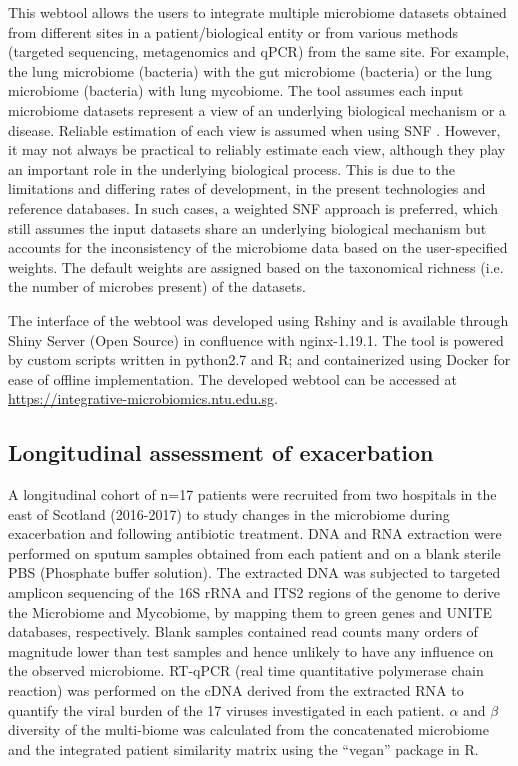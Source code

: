 This webtool allows the users to integrate multiple microbiome datasets obtained from different sites in a patient/biological entity or from various methods (targeted sequencing, metagenomics and qPCR) from the same site. For example, the lung microbiome (bacteria) with the gut microbiome (bacteria) or the lung microbiome (bacteria) with lung mycobiome. The tool assumes each input microbiome datasets represent a view of an underlying biological mechanism or a disease. Reliable estimation of each view is assumed when using SNF \cite{Jiang2019}. However, it may not always be practical to reliably estimate each view, although they play an important role in the underlying biological process. This is due to the limitations and differing rates of development, in the present technologies and reference databases. In such cases, a weighted SNF approach is preferred, which still assumes the input datasets share an underlying biological mechanism but accounts for the inconsistency of the microbiome data based on the user-specified weights. The default weights are assigned based on the taxonomical richness (i.e. the number of microbes present) of the datasets. 

The interface of the webtool was developed using Rshiny and is available through Shiny Server (Open Source) in confluence with nginx-1.19.1. The tool is powered by custom scripts written in python2.7 and R; and containerized using Docker for ease of offline implementation. The developed webtool can be accessed at \url{https://integrative-microbiomics.ntu.edu.sg}.

\subsection{Longitudinal assessment of exacerbation}

A longitudinal cohort of n=17 patients were recruited from two hospitals in the east of Scotland (2016-2017) to study changes in the microbiome during exacerbation and following antibiotic treatment. DNA and RNA extraction were performed on sputum samples obtained from each patient and on a blank sterile PBS (Phosphate buffer solution). The extracted DNA was subjected to targeted amplicon sequencing of the 16S rRNA and ITS2 regions of the genome to derive the Microbiome and Mycobiome, by mapping them to green genes and UNITE databases, respectively. Blank samples contained read counts many orders of magnitude lower than test samples and hence unlikely to have any influence on the observed microbiome. RT-qPCR (real time quantitative polymerase chain reaction) was performed on the cDNA derived from the extracted RNA to quantify the viral burden of the 17 viruses investigated in each patient. $\alpha$ and $\beta$ diversity of the multi-biome was calculated from the concatenated microbiome and the integrated patient similarity matrix using the “vegan” package in R.


